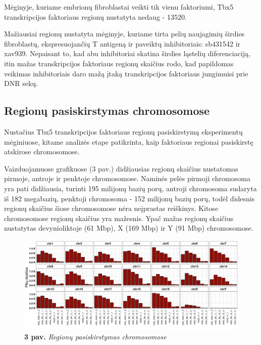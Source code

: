 \documentclass[12pt]{article}
\begin{document}
Mėginyje, kuriame embrionų fibroblastai veikti tik vienu faktoriumi, Tbx5
transkripcijos faktoriaus regionų nustatyta nedaug - 13520.

Mažiausiai regionų nustatyta mėginyje, kuriame tirta pelių naujagimių širdies
fibroblastų, ekspresuojančių T antigeną ir paveiktų inhibitoriais: sb431542 ir
xav939. Nepaisant to, kad abu inhibitoriai skatina širdies ląstelių
diferenciaciją\cite{HEART_CELL_DIFF_ARTCL}, itin mažas transkripcijos
faktoriaus regionų skaičius rodo, kad papildomas veikimas inhibitoriais daro
mažą įtaką transkripcijos faktoriaus jungimuisi prie DNR sekų.

\newpage


\subsection{Regionų pasiskirstymas chromosomose}
Nustačius Tbx5 transkripcijos faktoriaus regionų pasiskirstymą eksperimentų
mėginiuose, kitame analizės etape patikrinta, kaip faktoriaus regionai
pasiskirstę atskirose chromosomose.

Vaizduojamuose grafikuose (3 pav.) didžiausias regionų skaičius nustatomas
pirmoje, antroje ir penktoje chromosomose. Naminės pelės pirmoji chromosoma yra
pati didžiausia, turinti 195 milijonų bazių porų, antroji chromosoma sudaryta
iš 182 megabazių, penktoji chromosoma - 152 milijonų bazių porų, todėl didesnis
regionų skaičius šiose chromosomose nėra neįprastas reiškinys. Kitose
chromosomose regionų skaičius yra mažesnis. Ypač mažas regionų skaičius
nustatytas devynioliktoje (61 Mbp), X (169 Mbp) ir Y (91 Mbp) chromosomose.

\begin{figure}[htb]
    \begin{center}
        \includegraphics[width=0.8\linewidth]{../Figures/peak_counts_by_chr.png}
        \caption*{\textbf{3 pav.} \emph{Regionų pasiskirstymas chromosomose}}
    \end{center}
\end{figure}
\end{document}
